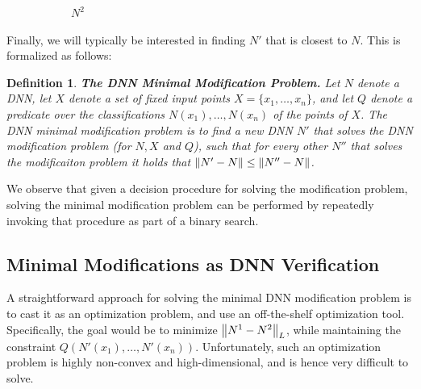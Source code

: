 \documentclass{easychair}
\newtheorem{definition}{Definition}
\newcommand{\guy}[1]{\marginpar{\textcolor{orange}{Guy: #1}}}
\begin{document}
\begin{figure}[htp]
\begin{subfigure}{0.5\linewidth}
    \caption{$N^2$}
  \end{subfigure}
  \caption{ }
  \label{fig:toyExampleModified}
\end{figure}
\guy{TODO: Ben, please continue with the same example from the
  previous section}

Finally, we will typically be interested in finding $N'$ that is
closest to $N$. This is formalized as follows:
\begin{definition}\textbf{The DNN Minimal Modification Problem.}
  Let $N$ denote a DNN, let $X$ denote a set of fixed input points
  $X=\{x_1, \ldots, x_n\}$, and let $Q$ denote a predicate over the
  classifications $N(x_1),\ldots,N(x_n)$ of the points of $X$. The
  \emph{DNN minimal modification problem} is to find a new DNN $N'$
  that solves the DNN modification problem (for $N, X$ and $Q$), such that for every other
  $N''$ that solves the modificaiton problem it holds that
  $\left\lVert N'-N\right\rVert\leq \left\lVert N''-N\right\rVert$.
\end{definition}
We observe that given a decision procedure for solving the modification
problem, solving the minimal modification problem can be performed by
repeatedly invoking that procedure as part of a binary search.

\subsection{Minimal Modifications as DNN Verification}

A straightforward approach for solving the minimal DNN modification
problem is to cast it as an optimization problem, and use an
off-the-shelf optimization tool. Specifically, the goal would be to
minimize $\left\lVert N^1-N^2\right\rVert_L$, while maintaining the constraint
$Q(N'(x_1),\ldots, N'(x_n))$. Unfortunately, such an optimization
problem is highly non-convex and high-dimensional, and is hence very
difficult to solve.
\end{document}
